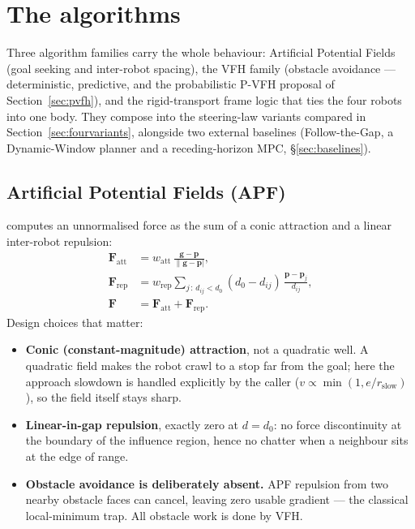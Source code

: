 \section{The algorithms}
\label{sec:algorithms}

Three algorithm families carry the whole behaviour: Artificial Potential
Fields (goal seeking and inter-robot spacing), the VFH family (obstacle
avoidance --- deterministic, predictive, and the probabilistic P-VFH proposal
of Section~\ref{sec:pvfh}), and the rigid-transport frame logic that ties the
four robots into one body. They compose into the steering-law variants
compared in Section~\ref{sec:fourvariants}, alongside two external
baselines (Follow-the-Gap, a Dynamic-Window planner and a
receding-horizon MPC, \S\ref{sec:baselines}).

\subsection{Artificial Potential Fields (APF)}

 computes an unnormalised force as the sum of a conic
attraction and a linear inter-robot repulsion:
%
\begin{align}
\mathbf{F}_{\mathrm{att}} &= w_{\mathrm{att}}\,
\frac{\mathbf{g} - \mathbf{p}}{\lVert \mathbf{g} - \mathbf{p} \rvert}, \\[4pt]
\mathbf{F}_{\mathrm{rep}} &= w_{\mathrm{rep}} \sum_{j \,:\, d_{ij} < d_0}
(d_0 - d_{ij})\, \frac{\mathbf{p} - \mathbf{p}_j}{d_{ij}}, \\[4pt]
\mathbf{F} &= \mathbf{F}_{\mathrm{att}} + \mathbf{F}_{\mathrm{rep}} .
\end{align}
%
Design choices that matter:

\begin{itemize}[leftmargin=1.6em]
\item \textbf{Conic (constant-magnitude) attraction}, not a quadratic well. A
quadratic field makes the robot crawl to a stop far from the goal; here the
approach slowdown is handled explicitly by the caller
($v \propto \min(1, e/r_{\mathrm{slow}})$), so the field itself stays sharp.
\item \textbf{Linear-in-gap repulsion}, exactly zero at $d = d_0$: no force
discontinuity at the boundary of the influence region, hence no chatter when
a neighbour sits at the edge of range.
\item \textbf{Obstacle avoidance is deliberately absent.} APF repulsion from
two nearby obstacle faces can cancel, leaving zero usable gradient --- the
classical local-minimum trap. All obstacle work is done by VFH.
\end{itemize}

